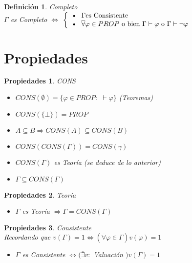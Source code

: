 \documentclass[12pt,a4paper]{article}
\newtheorem*{definition}{Definición}
\newtheorem*{props}{Propiedades}
\begin{document}
\begin{definition}
\emph{Completo} \\
$\Gamma$ es Completo $\Leftrightarrow$ $\left\{ \begin{array}{l} \text{\textbullet}\ \ \Gamma \textnormal{es Consistente} \\
 \text{\textbullet}\ \  \overline{\forall} \varphi \in PROP \textnormal{ o bien } \Gamma \vdash \varphi \textnormal{ o } \Gamma \vdash \neg \varphi
  \end{array}
  \right.$
\end{definition}

\section*{Propiedades}

\begin{props} CONS \\

	\begin{itemize}
		\item $ CONS( \emptyset) = \{ \varphi \in  PROP :$ $ \vdash \varphi  \}$ (Teoremas)
		\item $ CONS(\{ \bot \}) = PROP$
		\item $ A \subseteq B \Rightarrow CONS(A) \subseteq CONS(B)$
		\item $CONS(CONS(\Gamma)) = CONS(\gamma)$
		\item $CONS(\Gamma)$ es Teoría (se deduce de lo anterior)
		\item $\Gamma \subseteq CONS(\Gamma)$
	\end{itemize}
\end{props}

\begin{props} Teoría \\

	\begin{itemize}
		\item 	$\Gamma $ es Teoría $\Rightarrow \Gamma = CONS(\Gamma)$
	\end{itemize}
\end{props}

\begin{props} Consistente\\
	Recordando que $v(\Gamma) = 1\Leftrightarrow(\overline{\forall}\varphi \in \Gamma)v(\varphi)=1$
	\begin{itemize}
		\item $\Gamma$ es Consistente $\Leftrightarrow (\overline{\exists}v :$ Valuación $)v(\Gamma)=1$ 
	\end{itemize}

\end{props}
	
\end{document}
